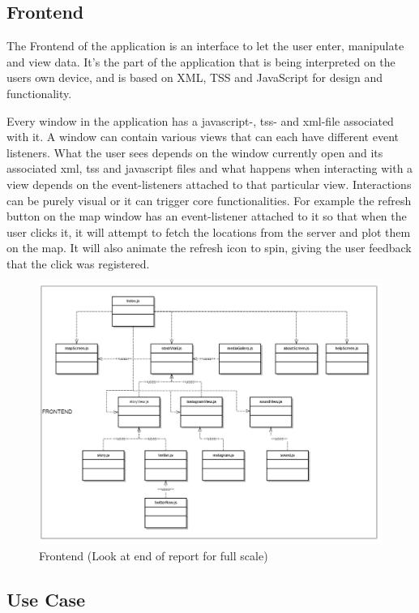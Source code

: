 \subsection{Frontend}
The Frontend of the application is an interface to let the user enter, manipulate and view data. It’s the part of the application that is being interpreted on the users own device, and is based on XML, TSS and JavaScript for design and functionality. 

Every window in the application has a javascript-, tss- and xml-file associated with it. A window can contain various views that can each have different event listeners. What the user sees depends on the window currently open and its associated xml, tss and javascript files and what happens when interacting with a view depends on the event-listeners attached to that particular view. Interactions can be purely visual or it can trigger core functionalities. For example the refresh button on the map window has an event-listener attached to it so that when the user clicks it, it will attempt to fetch the locations from the server and plot them on the map. It will also animate the refresh icon to spin, giving the user feedback that the click was registered.

\begin{figure}[!h]
\begin{center}
\includegraphics[scale=0.1]{class-frontend.png}
\caption{Frontend (Look at end of report for full scale)}
\end{center}
\end{figure}

\subsection{Use Case}

